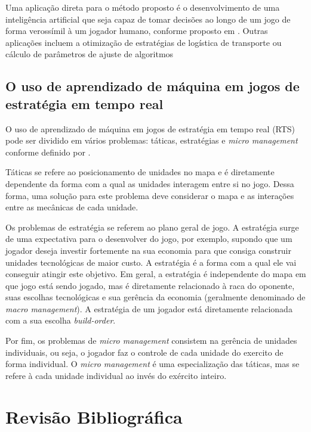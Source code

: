 Uma aplicação direta para o método proposto é o desenvolvimento de uma inteligência artificial que seja capaz de tomar decisões ao longo de um jogo de forma verossímil à um jogador humano, conforme proposto em \cite{synnaeve2011bayesian1}. Outras aplicações incluem a otimização de estratégias de logística de transporte ou cálculo de parâmetros de ajuste de algoritmos

		\section{O uso de aprendizado de máquina em jogos de estratégia em tempo real}
O uso de aprendizado de máquina em jogos de estratégia em tempo real (RTS) pode ser dividido em vários problemas: táticas, estratégias e \textit{micro management} conforme definido por \cite{synnaeve2011bayesian2}.

Táticas se refere ao posicionamento de \glspl{unidade} no mapa e é diretamente dependente da forma com a qual as \glspl{unidade} interagem entre si no jogo. Dessa forma, uma solução para este problema deve considerar o mapa e as interações entre as mecânicas de cada \gls{unidade}.

Os problemas de estratégia se referem ao plano geral de jogo. A estratégia surge de uma expectativa para o desenvolver do jogo, por exemplo, supondo que um jogador deseja investir fortemente na sua economia para que consiga construir \glspl{unidade} tecnológicas de maior custo. A estratégia é a forma com a qual ele vai conseguir atingir este objetivo. Em geral, a estratégia é independente do mapa em que jogo está sendo jogado, mas é diretamente relacionado à \gls{raca} do oponente, suas escolhas tecnológicas e sua gerência da economia (geralmente denominado de \textit{macro management}). A estratégia de um jogador está diretamente relacionada com a sua escolha \textit{\gls{build-order}}.

Por fim, os problemas de \textit{micro management} consistem na gerência de \glspl{unidade} individuais, ou seja, o jogador faz o controle de cada \gls{unidade} do exercito de forma individual. O  \textit{micro management} é uma especialização das táticas, mas se refere à cada \gls{unidade} individual ao invés do exército inteiro.

	\chapter{Revisão Bibliográfica}
